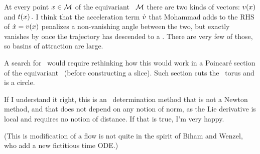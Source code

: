 \begin{description}
{At every point $x \in {\cal M}$ of the equivariant \statesp\ ${\cal M}$ there are two kinds of
vectors: $v(x)$ and $t(x)\,.$ I think that the
acceleration term $\dot{v}$ that Mohammad adds to the RHS of
$\dot{x} = v(x)$ penalizes a non-vanishing angle between the
two, but exactly vanishes by  once the trajectory has
descended to a \reqv. There are very few of those, so basins of
attraction are large.

A search for \reqv\ would require rethinking how this would work in a
Poincar\'e section of the equivariant \statesp\ (before constructing a
slice). Such section cuts the \rpo\ torus and is a circle.

If I understand it right, this is an \reqv\ determination method that is
not a Newton method, and that does not depend on any notion of norm, as
the Lie derivative is local and requires no notion of distance. If that
is true, I'm very happy.

(This is modification of a flow is not quite in the spirit of Biham and
Wenzel, who add a new fictitious time ODE.)
    }



%	
%



\end{description}
